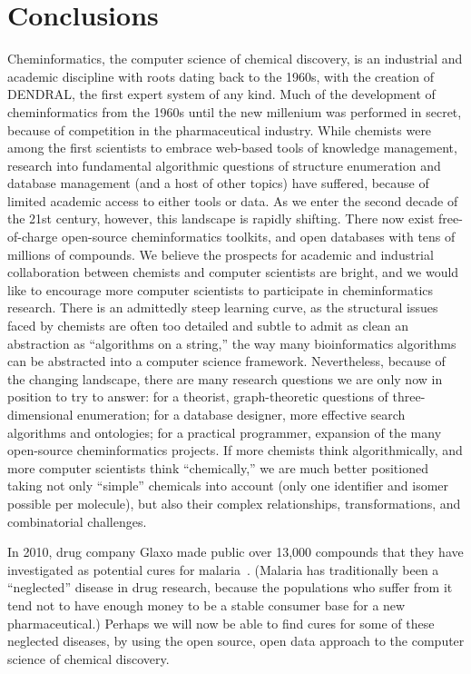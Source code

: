 \documentclass{sig-alternate}
\begin{document}
\section{Conclusions}
\label{sec:conclusions}
Cheminformatics, the computer science of chemical discovery, is an
industrial and academic discipline with roots dating back to the
1960s, with the creation of DENDRAL, the first expert system of any
kind.  Much of the development of cheminformatics from the 1960s until the new millenium
was performed in secret, because of competition in the pharmaceutical
industry.  While chemists were among the first scientists to embrace
web-based tools of knowledge management, research into fundamental
algorithmic questions of structure enumeration and database management
(and a host of other topics) have suffered, because of limited
academic access to either tools or data.  As we enter the second
decade of the 21st century, however, this landscape is rapidly
shifting.  There now exist free-of-charge open-source cheminformatics
toolkits, and open databases with tens of millions of compounds.  We
believe the prospects for academic and industrial collaboration
between chemists and computer scientists are bright, and we
would like to encourage more computer scientists to participate in
cheminformatics research.  There is an admittedly steep learning
curve, as the structural issues faced by chemists are often too
detailed and subtle to admit as clean an abstraction as ``algorithms
on a string,'' the way many bioinformatics algorithms can be abstracted into a computer science
framework.  Nevertheless, because of the changing landscape, there are
many research questions we are only now in position to try to answer:
for a theorist, graph-theoretic questions of three-dimensional
enumeration; for a database designer, more effective search algorithms
and ontologies; for a practical programmer, expansion of the many
open-source cheminformatics projects.  If more chemists think
algorithmically, and more computer scientists think ``chemically,''
we are much better positioned taking not only ``simple'' chemicals
into account (only one identifier and isomer possible per molecule),
but also their complex relationships, transformations, and
combinatorial challenges.

In 2010, drug company Glaxo made public over 13,000 compounds that they have investigated as potential cures for malaria~\cite{glaxo-malaria}.  (Malaria has traditionally been a ``neglected'' disease in drug research, because the populations who suffer from it tend not to have enough money to be a stable consumer base for a new pharmaceutical.)  Perhaps we will now be able to find cures for some of these neglected diseases, by using the open source, open data approach to the computer science of chemical discovery.
\end{document}
